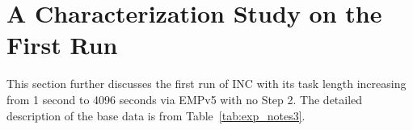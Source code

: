 \section{A Characterization Study on the First Run~\label{sec:sodb9_r3_hist}} 
This section further discusses the first run of 
INC with its task length increasing from 1 second to 4096 seconds via EMPv5 with no Step 2. 
The detailed description of the base data is from Table~\ref{tab:exp_notes3}.

%
%

